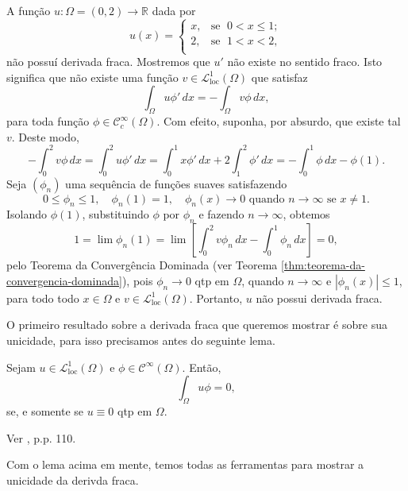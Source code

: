 \documentclass[a4paper, 11pt]{book}
\theoremstyle{definition}
\newcommand{\bR}{\mathbb{R}}
\newcommand{\cC}{\mathcal{C}}
\newcommand{\cL}{\mathcal{L}}
\newcommand{\loc}{\mathrm{loc}}
\begin{document}
\begin{ex}
    A função $u : \Omega  = (0,2) \to \bR$ dada por
    \[
        u(x) = \left\{
            \begin{array}{rl}
                x, & \!\text{se }\; 0 < x \leqslant 1;\\
                2, & \!\text{se }\; 1 < x < 2,\\
            \end{array}
        \right.
    \]
    não possuí derivada fraca.
    Mostremos que $u'$ não existe no sentido fraco.
    Isto significa que não existe uma função $v \in \cL^1_\loc(\Omega)$ que satisfaz
    \[
        \int_\Omega u \phi' \, dx = -\int_\Omega v \phi \,dx,
    \]
    para toda função $\phi \in \cC_c^\infty(\Omega)$. 
    Com efeito, suponha, por absurdo, que existe tal $v$. Deste modo,
    \[
        -\int_0^2 v \phi \, dx = \int_0^2 u \phi' \,dx = \int_0^1 x \phi' \,dx + 2\int_1^2 \phi' \,dx =- \int_0^1 \phi \,dx - \phi(1).
    \]
    Seja $(\phi_n)$ uma sequência de funções suaves satisfazendo
    \[
        0 \leqslant \phi_n \leqslant 1, \quad \phi_n(1) = 1, \quad \phi_n(x) \to 0 \text{ quando } n\to\infty\text{ se } x \neq 1.
    \]
    Isolando $\phi(1)$, substituindo $\phi$ por $\phi_n$ e fazendo $n \to \infty$, obtemos
    \[
        1 = \lim \phi_n(1) = \lim \left[ \int_0^2 v \phi_n \, dx- \int_0^1 \phi_n \,dx \right] = 0,
    \]
    pelo Teorema da Convergência Dominada (ver Teorema \ref{thm:teorema-da-convergencia-dominada}), pois $\phi_n \to 0$ qtp em $\Omega$, quando $n\to\infty$ e $|\phi_n(x)| \leqslant 1$, para todo todo $x \in \Omega$ e $v \in \cL^1_\loc(\Omega)$.
    Portanto, $u$ não possui derivada fraca.
\end{ex}

O primeiro resultado sobre a derivada fraca que queremos mostrar é sobre sua unicidade, para isso precisamos antes do seguinte lema.

\begin{lbox} \label{lm:lema}
    Sejam $u \in \cL^1_{\loc}(\Omega)$ e $\phi \in \cC^\infty(\Omega)$.
    Então,
    \[
        \int_\Omega u \phi = 0,
    \]
    se, e somente se $u \equiv 0$ qtp em $\Omega$.
\end{lbox}
\begin{prf}
    Ver \cite{brezis-functional.analysis}, p.p. 110.
\end{prf}

Com o lema acima em mente, temos todas as ferramentas para mostrar a unicidade da derivda fraca.
\end{document}
